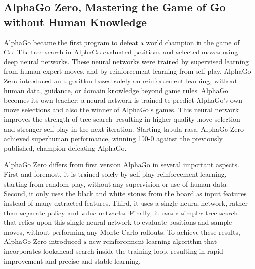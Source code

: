 \documentclass[12pt,a4paper]{article}
\begin{document}
\subsection{AlphaGo Zero, Mastering the Game of Go without Human Knowledge}

\hspace{0.6cm} AlphaGo became the first program to defeat a world champion in the game of Go. The tree search in AlphaGo evaluated positions and selected moves using deep neural networks. These neural networks were trained by supervised learning from human expert moves, and by reinforcement learning from self-play. AlphaGo Zero introduced an algorithm based solely on reinforcement learning, without human data, guidance, or domain knowledge beyond game rules. AlphaGo becomes its own teacher: a neural network is trained to predict AlphaGo’s own move selections and also the winner of AlphaGo’s games. This neural network improves the strength of tree search, resulting in higher quality move selection and stronger self-play in the next iteration. Starting tabula rasa, AlphaGo Zero achieved superhuman performance, winning 100-0 against the previously published, champion-defeating AlphaGo.\par
\hspace{0cm}AlphaGo Zero differs from first version AlphaGo in several important aspects. First and foremost, it is trained solely by self-play reinforcement learning, starting from random play, without any supervision or use of human data. Second, it only uses the black and white stones from the board as input features instead of many extracted features. Third, it uses a single neural network, rather than separate policy and value networks. Finally, it uses a simpler tree search that relies upon this single neural network to evaluate positions and sample moves, without performing any Monte-Carlo rollouts. To achieve these results, AlphaGo Zero introduced a new reinforcement learning algorithm that incorporates lookahead search inside the training loop, resulting in rapid improvement and precise and stable learning\cite{AlphaGoZero}.\par
\end{document}
